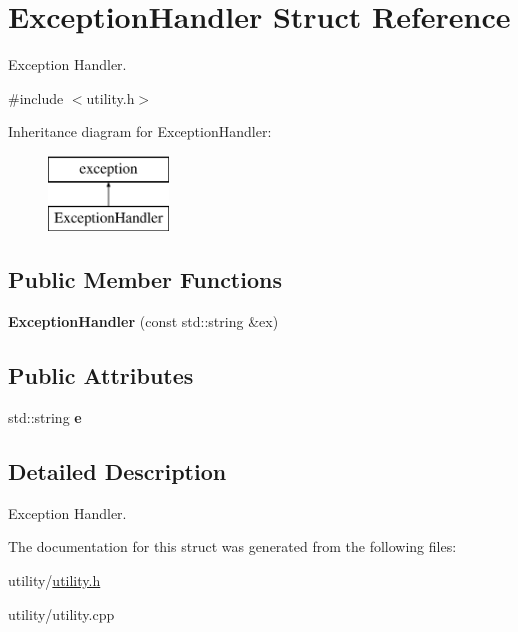 \hypertarget{struct_exception_handler}{}\section{Exception\+Handler Struct Reference}
\label{struct_exception_handler}


Exception Handler.  




{\ttfamily \#include $<$utility.\+h$>$}

Inheritance diagram for Exception\+Handler\+:\begin{figure}[H]
\begin{center}
\leavevmode
\includegraphics[height=2.000000cm]{struct_exception_handler}
\end{center}
\end{figure}
\subsection*{Public Member Functions}
\begin{DoxyCompactItemize}
\item 
\mbox{\label{struct_exception_handler_ae134c5213991a7b0983cdf8891a5f9e8}} 
{\bfseries Exception\+Handler} (const std\+::string \&ex)
\end{DoxyCompactItemize}
\subsection*{Public Attributes}
\begin{DoxyCompactItemize}
\item 
\mbox{\label{struct_exception_handler_ae18ca9e51660276419ca7e35d0b0db1c}} 
std\+::string {\bfseries e}
\end{DoxyCompactItemize}


\subsection{Detailed Description}
Exception Handler. 

The documentation for this struct was generated from the following files\+:\begin{DoxyCompactItemize}
\item 
utility/\hyperlink{utility_8h}{utility.\+h}\item 
utility/utility.\+cpp\end{DoxyCompactItemize}
